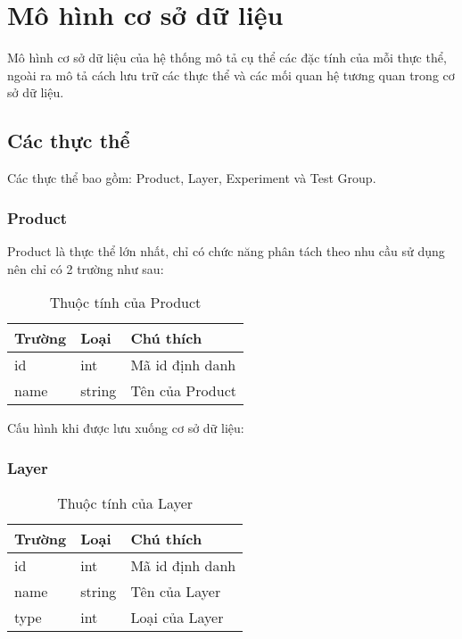 \section{Mô hình cơ sở dữ liệu}

Mô hình cơ sở dữ liệu của hệ thống mô tả cụ thể các đặc tính của mỗi thực thể, ngoài ra mô tả
cách lưu trữ các thực thể và các mối quan hệ tương quan trong cơ sở dữ liệu.

\subsection{Các thực thể}

Các thực thể bao gồm: Product, Layer, Experiment và Test Group.

\subsubsection{Product}

Product là thực thể lớn nhất, chỉ có chức năng phân tách theo nhu cầu sử dụng nên chỉ có 2 trường như sau:
\begin{table}[H]
	\centering
	\begin{tabular}{|l|l|l|}
		\hline
		Trường & Loại   & Chú thích       \\ \hline
		id     & int    & Mã id định danh \\ \hline
		name   & string & Tên của Product \\ \hline
	\end{tabular}
	\caption{Thuộc tính của Product}
\end{table}

Cấu hình khi được lưu xuống cơ sở dữ liệu:

\begin{itemize}
\end{itemize}

\subsubsection{Layer}

\begin{table}[H]
	\centering
	\begin{tabular}{|l|l|l|}
		\hline
		Trường & Loại   & Chú thích       \\ \hline
		id     & int    & Mã id định danh \\ \hline
		name   & string & Tên của Layer   \\ \hline
		type   & int    & Loại của Layer  \\ \hline
	\end{tabular}
	\caption{Thuộc tính của Layer}
\end{table}

